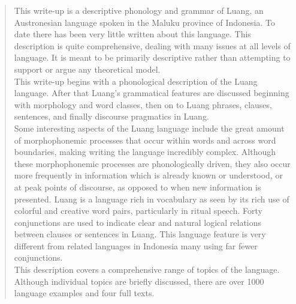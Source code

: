 \documentclass[10pt]{article}
\begin{document}
\begin{abstract}
This write-up is a descriptive phonology and grammar of Luang, an Austronesian language spoken in the Maluku province of Indonesia. To date there has been very little written about this language. This description is quite comprehensive, dealing with many issues at all levels of language. It is meant to be primarily descriptive rather than attempting to support or argue any theoretical model.\\
This write-up begins with a phonological description of the Luang language. After that Luang's grammatical features are discussed beginning with morphology and word classes, then on to Luang phrases, clauses, sentences, and finally discourse pragmatics in Luang.\\
Some interesting aspects of the Luang language include the great amount of morphophonemic processes that occur within words and across word boundaries, making writing the language incredibly complex. Although these morphophonemic processes are phonologically driven, they also occur more frequently in information which is already known or understood, or at peak points of discourse, as opposed to when new information is presented. Luang is a language rich in vocabulary as seen by its rich use of colorful and creative word pairs, particularly in ritual speech. Forty conjunctions are used to indicate clear and natural logical relations between clauses or sentences in Luang. This language feature is very different from related languages in Indonesia many using far fewer conjunctions.\\
This description covers a comprehensive range of topics of the language. Although individual topics are briefly discussed, there are over 1000 language examples and four full texts.
\end{abstract}
\end{document}
